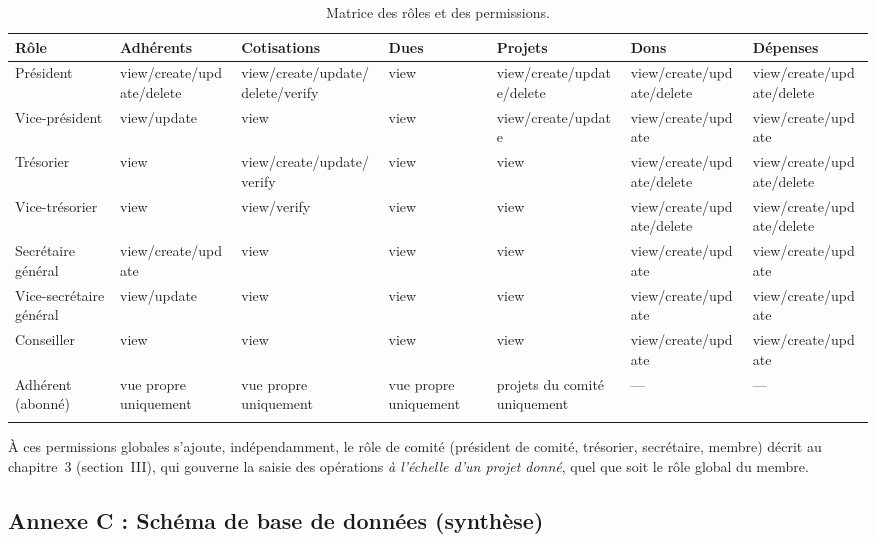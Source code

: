\begin{center}
\begin{longtable}{@{}p{2.6cm}p{2.1cm}p{2.9cm}p{1.2cm}p{2.1cm}p{2.4cm}p{2.4cm}@{}}
\toprule
\textbf{Rôle} & \textbf{Adhérents} & \textbf{Cotisations} & \textbf{Dues} & \textbf{Projets} & \textbf{Dons} & \textbf{Dépenses} \\
\midrule
\endhead
Président & view/create/\allowbreak update/delete & view/create/\allowbreak update/delete/\allowbreak verify & view & view/create/\allowbreak update/delete & view/create/\allowbreak update/delete & view/create/\allowbreak update/delete \\
Vice-président & view/update & view & view & view/create/\allowbreak update & view/create/\allowbreak update & view/create/\allowbreak update \\
Trésorier & view & view/create/\allowbreak update/verify & view & view & view/create/\allowbreak update/delete & view/create/\allowbreak update/delete \\
Vice-trésorier & view & view/verify & view & view & view/create/\allowbreak update/delete & view/create/\allowbreak update/delete \\
Secrétaire général & view/create/\allowbreak update & view & view & view & view/create/\allowbreak update & view/create/\allowbreak update \\
Vice-secrétaire général & view/update & view & view & view & view/create/\allowbreak update & view/create/\allowbreak update \\
Conseiller & view & view & view & view & view/create/\allowbreak update & view/create/\allowbreak update \\
Adhérent (abonné) & vue propre uniquement & vue propre uniquement & vue propre uniquement & projets du comité uniquement & --- & --- \\
\bottomrule
\caption{Matrice des rôles et des permissions.}
\label{tab:permissions}
\end{longtable}
\end{center}

À ces permissions globales s'ajoute, indépendamment, le rôle de comité
(président de comité, trésorier, secrétaire, membre) décrit au
chapitre~3 (section~III), qui gouverne la saisie des opérations
\emph{à l'échelle d'un projet donné}, quel que soit le rôle global du
membre.

\subsection*{Annexe C : Schéma de base de données (synthèse)}

